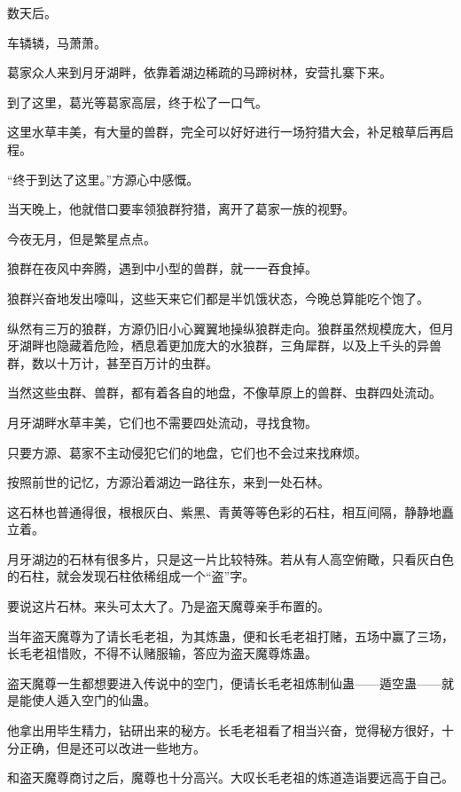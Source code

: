 
\begin{this_body}



数天后。

车辚辚，马萧萧。

葛家众人来到月牙湖畔，依靠着湖边稀疏的马蹄树林，安营扎寨下来。

到了这里，葛光等葛家高层，终于松了一口气。

这里水草丰美，有大量的兽群，完全可以好好进行一场狩猎大会，补足粮草后再启程。

“终于到达了这里。”方源心中感慨。

当天晚上，他就借口要率领狼群狩猎，离开了葛家一族的视野。

今夜无月，但是繁星点点。

狼群在夜风中奔腾，遇到中小型的兽群，就一一吞食掉。

狼群兴奋地发出嚎叫，这些天来它们都是半饥饿状态，今晚总算能吃个饱了。

纵然有三万的狼群，方源仍旧小心翼翼地操纵狼群走向。狼群虽然规模庞大，但月牙湖畔也隐藏着危险，栖息着更加庞大的水狼群，三角犀群，以及上千头的异兽群，数以十万计，甚至百万计的虫群。

当然这些虫群、兽群，都有着各自的地盘，不像草原上的兽群、虫群四处流动。

月牙湖畔水草丰美，它们也不需要四处流动，寻找食物。

只要方源、葛家不主动侵犯它们的地盘，它们也不会过来找麻烦。

按照前世的记忆，方源沿着湖边一路往东，来到一处石林。

这石林也普通得很，根根灰白、紫黑、青黄等等色彩的石柱，相互间隔，静静地矗立着。

月牙湖边的石林有很多片，只是这一片比较特殊。若从有人高空俯瞰，只看灰白色的石柱，就会发现石柱依稀组成一个“盗”字。

要说这片石林。来头可太大了。乃是盗天魔尊亲手布置的。

当年盗天魔尊为了请长毛老祖，为其炼蛊，便和长毛老祖打赌，五场中赢了三场，长毛老祖惜败，不得不认赌服输，答应为盗天魔尊炼蛊。

盗天魔尊一生都想要进入传说中的空门，便请长毛老祖炼制仙蛊——遁空蛊——就是能使人遁入空门的仙蛊。

他拿出用毕生精力，钻研出来的秘方。长毛老祖看了相当兴奋，觉得秘方很好，十分正确，但是还可以改进一些地方。

和盗天魔尊商讨之后，魔尊也十分高兴。大叹长毛老祖的炼道造诣要远高于自己。


\end{this_body}
